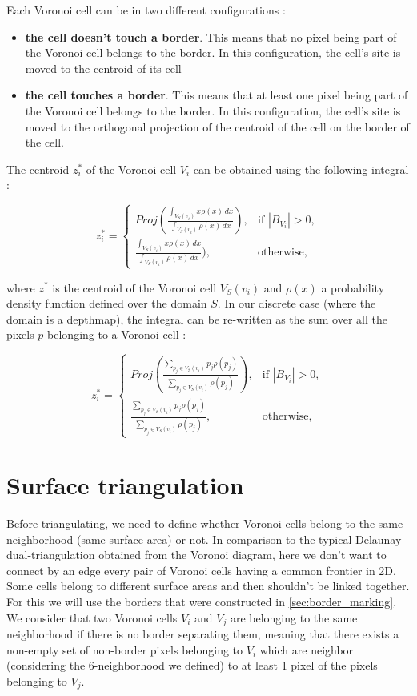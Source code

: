 \documentclass[11pt,fleqn]{book} %
\begin{document}
Each Voronoi cell can be in two different configurations : 
\begin{itemize}
	\item \textbf{the cell doesn't touch a border}. This means that no pixel being part of the Voronoi cell belongs to the border.
	In this configuration, the cell's site is moved to the centroid of its cell
	\item \textbf{the cell touches a border}. This means that at least one pixel being part of the Voronoi cell belongs to the border.
	In this configuration, the cell's site is moved to the orthogonal projection of the centroid of the cell on the border of the cell.
\end{itemize}

The centroid $z_i^*$ of the Voronoi cell $V_i$ can be obtained using the following integral :

\begin{equation}
		z_i^* = \begin{cases}
		Proj(\frac{\int_{V_S(v_i)} x\rho(x)\,dx}{\int_{V_S(v_i)} \rho(x)\,dx}) , & \text{if $|B_{V_i}| > 0$}, \\
		\frac{\int_{V_S(v_i)} x\rho(x)\,dx}{\int_{V_S(v_i)} \rho(x)\,dx}), & \text{otherwise}, 
		\end{cases}
\end{equation}

where $z^*$ is the centroid of the Voronoi cell $V_S(v_i)$ and $\rho(x)$ a probability density function defined over the domain $S$.
In our discrete case (where the domain is a depthmap), the integral can be re-written as the sum over all the pixels $p$ belonging to a Voronoi cell : 

\begin{equation}
		z_i^* = \begin{cases}
		Proj(\frac{\sum_{p_j \in V_S(v_i)} p_j\rho(p_j)}{\sum_{p_j \in V_S(v_i)} \rho(p_j)}) , & \text{if $|B_{V_i}| > 0$}, \\
		\frac{\sum_{p_j \in V_S(v_i)} p_j\rho(p_j)}{\sum_{p_j \in V_S(v_i)} \rho(p_j)}, & \text{otherwise}, 
		\end{cases}
\end{equation}

\section{Surface triangulation}
\label{sec:surface_triangulation}
Before triangulating, we need to define whether Voronoi cells belong to the same neighborhood (same surface area) or not. In comparison to the typical Delaunay dual-triangulation obtained from the Voronoi diagram, here we don't want to connect by an edge every pair of Voronoi cells having a common frontier in 2D. Some cells belong to different surface areas and then shouldn't be linked together.
For this we will use the borders that were constructed in \ref{sec:border_marking}.
We consider that two Voronoi cells $V_i$ and $V_j$ are belonging to the same neighborhood if there is no border separating them, meaning that there exists a non-empty set of non-border pixels belonging to $V_i$ which are neighbor (considering the 6-neighborhood we defined) to at least 1 pixel of the pixels belonging to $V_j$.
\end{document}
